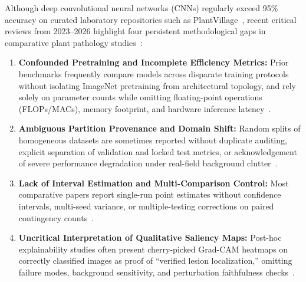 \documentclass[journal]{IEEEtran}
\begin{document}
Although deep convolutional neural networks (CNNs) regularly exceed 95\% accuracy on curated laboratory repositories such as PlantVillage~\cite{mohanty2016, too2019}, recent critical reviews from 2023--2026 highlight four persistent methodological gaps in comparative plant pathology studies~\cite{ahmad2023, lu2024frontiers, ngugi2024jiii, bench2025scirep, xai2026review}:
\begin{enumerate}
    \item \textbf{Confounded Pretraining and Incomplete Efficiency Metrics:} Prior benchmarks frequently compare models across disparate training protocols without isolating ImageNet pretraining from architectural topology, and rely solely on parameter counts while omitting floating-point operations (FLOPs/MACs), memory footprint, and hardware inference latency~\cite{bench2025scirep}.
    \item \textbf{Ambiguous Partition Provenance and Domain Shift:} Random splits of homogeneous datasets are sometimes reported without duplicate auditing, explicit separation of validation and locked test metrics, or acknowledgement of severe performance degradation under real-field background clutter~\cite{ahmad2023, lu2024frontiers}.
    \item \textbf{Lack of Interval Estimation and Multi-Comparison Control:} Most comparative papers report single-run point estimates without confidence intervals, multi-seed variance, or multiple-testing corrections on paired contingency counts~\cite{dietterich1998, ngugi2024jiii}.
    \item \textbf{Uncritical Interpretation of Qualitative Saliency Maps:} Post-hoc explainability studies often present cherry-picked Grad-CAM heatmaps on correctly classified images as proof of ``verified lesion localization,'' omitting failure modes, background sensitivity, and perturbation faithfulness checks~\cite{selvaraju2017, xai2026review}.
\end{enumerate}
\end{document}
